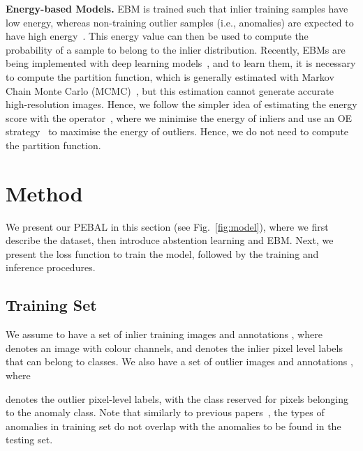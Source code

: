 \documentclass[runningheads]{llncs}
\begin{document}
\noindent\textbf{Energy-based Models.}
EBM is trained such that inlier training samples have low energy, whereas non-training outlier samples (i.e., anomalies) are expected to have high energy~\cite{lecun2006tutorial}.
This energy value can then be used to compute the probability of a sample to belong to the inlier distribution.
Recently, EBMs are being implemented with deep learning models~\cite{nijkamp2019learning,grathwohl2019your,liu2020energy}, and to learn them, it is necessary to compute the partition function, which is generally estimated with Markov Chain Monte Carlo (MCMC)~\cite{grathwohl2019your}, but this estimation cannot generate accurate high-resolution images.
Hence, we follow the simpler idea of estimating the energy score with the  operator~\cite{grathwohl2019your,liu2020energy}, where we minimise the energy of inliers and use an OE  strategy~\cite{hendrycks2018deep} to maximise the energy of outliers. Hence, we do not need to compute the partition function.
\vspace{-10pt}


\section{Method}
\label{sec:method}



We present our PEBAL in this section (see Fig.~\ref{fig:model}), where we first describe the dataset, then  introduce abstention learning and EBM. Next, we present the loss function to train the model, followed by the training and inference procedures. 


\vspace{-10pt}
\subsection{Training Set}

We assume to have a set of inlier training images and annotations , where
 denotes an image with  colour channels, and
 denotes the inlier pixel level labels that can belong to  classes. 
We also have a set of outlier images and annotations , where
 
denotes the outlier pixel-level labels, with the class  reserved for pixels belonging to the anomaly class. 
Note that similarly to previous papers~\cite{chan2021entropy}, the types of anomalies in training set  do not overlap with the anomalies to be found in the testing set.
\end{document}
